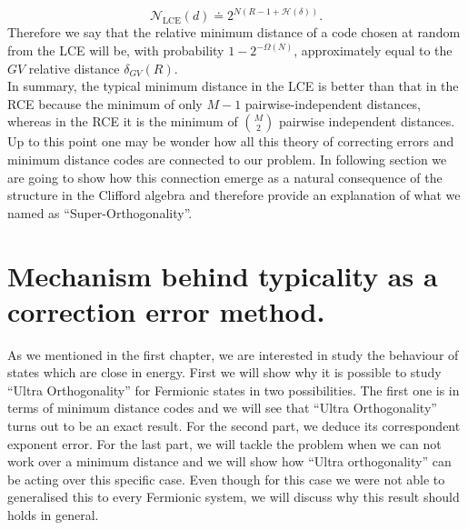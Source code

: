 \begin{equation}
\mathcal{N}_{\mathrm{LCE}}(d) \doteq 2^{N(R-1+\mathcal{H}(\delta))}.
\end{equation}
Therefore we say that the relative minimum distance of a code chosen at random from the LCE will be, with probability $1-2^{-\Omega(N)}$, approximately equal to the $GV$ relative distance $\delta_{GV}(R)$.\\
In summary, the typical minimum distance in the LCE is better than that in the RCE because the minimum of only $M-1$ pairwise-independent distances, whereas in the RCE it is the minimum of ${M\choose 2}$ pairwise independent distances.\\
Up to this point one may be wonder how all this theory of correcting errors and minimum distance codes are connected to our problem. In following section we are going to show how this connection emerge as a natural consequence of the structure in the Clifford algebra and therefore provide an explanation of what we named as ``Super-Orthogonality''.
\section{Mechanism behind typicality as a correction error method.}
As we mentioned in the first chapter, we are interested in study the behaviour of states which are close in energy. First we will show why it is possible to study ``Ultra Orthogonality'' for Fermionic states in two possibilities. The first one is in terms of minimum distance codes and we will see that ``Ultra Orthogonality'' turns out to be an exact result. For the second part, we deduce its correspondent exponent error. For the last part, we will tackle the problem when we can not work over a minimum distance and we will show how ``Ultra orthogonality'' can be acting over this specific case. Even though for this case we were not able to generalised this to every Fermionic system, we will discuss why this result should holds in general.\\
